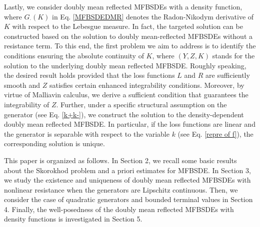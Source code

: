 \documentclass[10pt]{article}%
\numberwithin{equation}{section}
\begin{document}
Lastly, we consider doubly mean reflected MFBSDEs with a density function, {where $G_{\cdot}(K)$ in Eq. \eqref{MFBSDEDMR} denotes the Radon-Nikodym derivative of 
$K$ with respect to the Lebesgue measure.  In fact, the targeted solution can be constructed based on the solution to doubly mean-reflected MFBSDEs without a resistance term. To this end, the first problem we aim to address is to identify the conditions ensuring the absolute continuity of $K$, where $(Y,Z,K)$ stands for the solution to the underlying doubly mean reflected MFBSDE. Roughly speaking, the desired result holds provided that the loss functions $L$ and $R$  are sufficiently smooth and $Z$ satisfies certain enhanced integrability conditions. Moreover, by virtue of Malliavin  calculus, we derive a sufficient condition that guarantees the integrability of $Z$. Further, under a specific structural assumption on the generator (see Eq. \eqref{k+k-}), we construct the solution to the density-dependent doubly mean reflected MFBSDE. In particular, if the loss functions are linear and the generator is separable with respect to the variable $k$ (see Eq. \eqref{repre of f}), the corresponding solution is  unique.
} %
 
This paper is organized as follows. In Section 2, we recall some basic results about the Skorokhod problem and a priori estimates for MFBSDE. In Section 3,  we study the existence and uniqueness of doubly mean reflected MFBSDEs with nonlinear resistance when the generators are Lipschitz continuous. Then, we consider the case of quadratic generators and bounded terminal values in Section 4. Finally, the well-posedness of the doubly mean reflected MFBSDEs with density functions is investigated in Section 5. 
 
\end{document}
